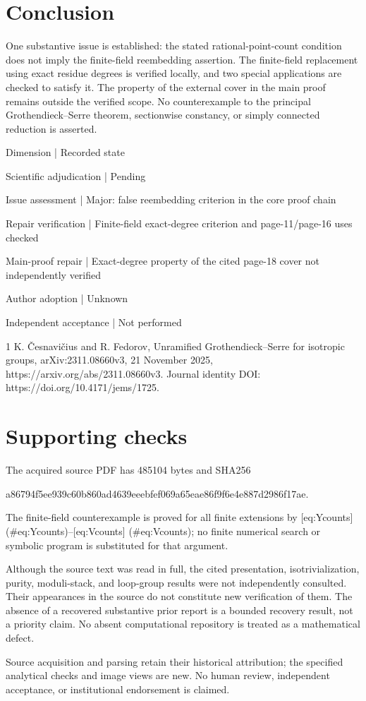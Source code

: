 \documentclass[10pt]{article}
\begin{document}
\section*{Conclusion}
One substantive issue is established: the stated rational-point-count condition does not imply the finite-field reembedding assertion. The finite-field replacement using exact residue degrees is verified locally, and two special applications are checked to satisfy it. The property of the external cover in the main proof remains outside the verified scope. No counterexample to the principal Grothendieck–Serre theorem, sectionwise constancy, or simply connected reduction is asserted.\par
Dimension | Recorded state\par
Scientific adjudication | Pending\par
Issue assessment | Major: false reembedding criterion in the core proof chain\par
Repair verification | Finite-field exact-degree criterion and page-11/page-16 uses checked\par
Main-proof repair | Exact-degree property of the cited page-18 cover not independently verified\par
Author adoption | Unknown\par
Independent acceptance | Not performed\par
1 K. Česnavičius and R. Fedorov, Unramified Grothendieck–Serre for isotropic groups, arXiv:2311.08660v3, 21 November 2025, https://arxiv.org/abs/2311.08660v3. Journal identity DOI: https://doi.org/10.4171/jems/1725.\par
\section*{Supporting checks}
The acquired source PDF has 485104 bytes and SHA256\par
a86794f5ee939c60b860ad4639eeebfef069a65eae86f9f6e4e887d2986f17ae.\par
The finite-field counterexample is proved for all finite extensions by [eq:Ycounts] (\#eq:Ycounts)–[eq:Vcounts] (\#eq:Vcounts); no finite numerical search or symbolic program is substituted for that argument.\par
Although the source text was read in full, the cited presentation, isotrivialization, purity, moduli-stack, and loop-group results were not independently consulted. Their appearances in the source do not constitute new verification of them. The absence of a recovered substantive prior report is a bounded recovery result, not a priority claim. No absent computational repository is treated as a mathematical defect.\par
Source acquisition and parsing retain their historical attribution; the specified analytical checks and image views are new. No human review, independent acceptance, or institutional endorsement is claimed.\par
\end{document}
